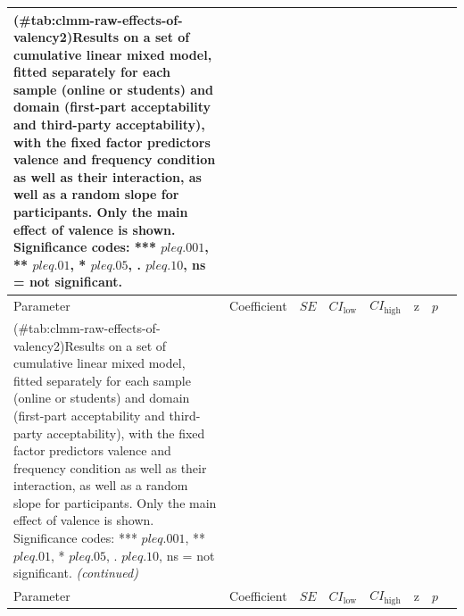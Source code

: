 \documentclass[
]{article}
\begin{document}
\begin{longtable}[t]{lrrrrrrl}
\caption{(\#tab:clmm-raw-effects-of-valency2)Results on a set of cumulative linear mixed model, fitted separately for each sample (online or students) and domain (first-part acceptability and third-party acceptability), with the fixed factor predictors valence and frequency condition as well as their interaction, as well as a random slope for participants. Only the main effect of valence is shown. Significance codes: *** $p \\leq .001$, ** $p \\leq .01$, * $p \\leq .05$, . $p \\leq .10$, ns = not significant.}\\
\toprule
Parameter & Coefficient & $\mathit{SE}$ & $CI_{\text{low}}$ & $CI_{\text{high}}$ & z & $p$ &  \\
\midrule
\endfirsthead
\caption[]{(\#tab:clmm-raw-effects-of-valency2)Results on a set of cumulative linear mixed model, fitted separately for each sample (online or students) and domain (first-part acceptability and third-party acceptability), with the fixed factor predictors valence and frequency condition as well as their interaction, as well as a random slope for participants. Only the main effect of valence is shown. Significance codes: *** $p \\leq .001$, ** $p \\leq .01$, * $p \\leq .05$, . $p \\leq .10$, ns = not significant. \textit{(continued)}}\\
\toprule
Parameter & Coefficient & $\mathit{SE}$ & $CI_{\text{low}}$ & $CI_{\text{high}}$ & z & $p$ &  \\
\midrule
\endhead


\end{longtable}
\end{document}
